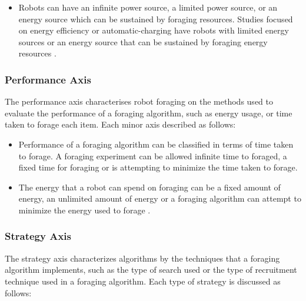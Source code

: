 \begin{itemize}
\item Robots can have an infinite power source, a limited power source, or an energy source which can be sustained by foraging resources. Studies focused on energy efficiency or automatic-charging have robots with limited energy sources or an energy source that can be sustained by foraging energy resources \cite{liu2006strategies}.

\end{itemize}

\subsubsection{Performance Axis}
The performance axis characterises robot foraging on the methods used to evaluate the performance of a foraging algorithm, such as energy usage, or time taken to forage each item. Each minor axis described as follows:

\begin{itemize}
\item Performance of a foraging algorithm can be classified in terms of time taken to forage. A foraging experiment can be allowed infinite time to foraged, a fixed time for foraging or is attempting to minimize the time taken to forage.
\item The energy that a robot can spend on foraging can be a fixed amount of energy, an unlimited amount of energy or a foraging algorithm can attempt to minimize the energy used to forage \cite{liu2006strategies}.
\end{itemize}

\subsubsection{Strategy Axis}
The strategy axis characterizes algorithms by the techniques that a foraging algorithm implements, such as the type of search used or the type of recruitment technique used in a foraging algorithm. Each type of strategy is discussed as follows:

